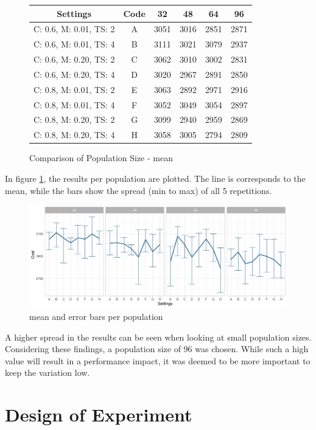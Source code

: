 \begin{figure}[ht]
	\centering
\begin{tabular}{ c|c|cccc  }
	\hline
	Settings & Code & 32 & 48 & 64 & 96\\
	\hline
	C: 0.6, M: 0.01, TS: 2   	& A & 3051 & 3016 & 2851 & 2871\\
	C: 0.6, M: 0.01, TS: 4		& B & 3111 & 3021 & 3079 & 2937\\
	C: 0.6, M: 0.20, TS: 2 		& C & 3062 & 3010 & 3002 & 2831\\
	C: 0.6, M: 0.20, TS: 4    	& D & 3020 & 2967 & 2891 & 2850\\
	C: 0.8, M: 0.01, TS: 2   	& E & 3063 & 2892 & 2971 & 2916\\
	C: 0.8, M: 0.01, TS: 4		& F & 3052 & 3049 & 3054 & 2897\\
	C: 0.8, M: 0.20, TS: 2 		& G & 3099 & 2940 & 2959 & 2869\\
	C: 0.8, M: 0.20, TS: 4    	& H & 3058 & 3005 & 2794 & 2809\\
	\hline
\end{tabular}
\caption{Comparison of Population Size - mean}
\end{figure}


In figure \ref{figure:population:results}, the results per population are plotted. The line is corresponds to the mean, while the bars show the spread (min to max) of all 5 repetitions.
\begin{figure}[ht] 
	\includegraphics[width=1\linewidth]{simulations/population/plots/comparison}
	\caption{mean and error bars per population}
		\label{figure:population:results}
\end{figure}


A higher spread in the results can be seen when looking at small population sizes. Considering these findings, a population size of 96 was chosen. While such a high value will result in a performance impact, it was deemed to be more important to keep the variation low.


\section{Design of Experiment}
\label{chap:hyperparameter_tuning:other_parameter}

